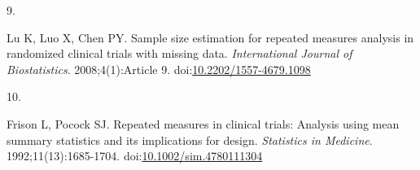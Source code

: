 \documentclass[
  11pt,
]{article}
\newlength{\cslhangindent}
\newlength{\csllabelwidth}
\newenvironment{CSLReferences}[2] %
 {\begin{list}{}{%
  \setlength{\itemindent}{0pt}
  \setlength{\leftmargin}{0pt}
  \setlength{\parsep}{0pt}
  \ifodd #1
   \setlength{\leftmargin}{\cslhangindent}
   \setlength{\itemindent}{-1\cslhangindent}
  \fi
  \setlength{\itemsep}{#2\baselineskip}}}
 {\end{list}}
\newcommand{\CSLLeftMargin}[1]{\parbox[t]{\csllabelwidth}{\strut#1\strut}}
\newcommand{\CSLRightInline}[1]{\parbox[t]{\linewidth - \csllabelwidth}{\strut#1\strut}}
\begin{document}
\begin{CSLReferences}{0}{1}
\CSLLeftMargin{9. }%
\CSLRightInline{Lu K, Luo X, Chen PY. Sample size estimation for repeated measures analysis in randomized clinical trials with missing data. \emph{International Journal of Biostatistics}. 2008;4(1):Article 9. doi:\href{https://doi.org/10.2202/1557-4679.1098}{10.2202/1557-4679.1098}}

\CSLLeftMargin{10. }%
\CSLRightInline{Frison L, Pocock SJ. Repeated measures in clinical trials: Analysis using mean summary statistics and its implications for design. \emph{Statistics in Medicine}. 1992;11(13):1685-1704. doi:\href{https://doi.org/10.1002/sim.4780111304}{10.1002/sim.4780111304}}

\end{CSLReferences}
\end{document}
